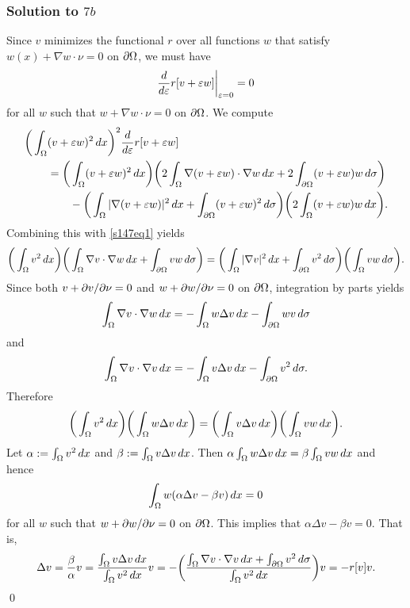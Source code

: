 \subsubsection*{Solution to $7b$}
Since $v$ minimizes the functional $r$ over all functions $w$ that satisfy $w(x) + \nabla w \cdot \nu = 0$ on $\partial\Omega$, we must have
\begin{align}\label{s147eq1}
\frac{d}{d\varepsilon}r[v + \varepsilon w]\bigg|_{\varepsilon = 0} = 0
\end{align}
for all $w$ such that $w + \nabla w \cdot \nu = 0$ on $\partial \Omega$.
We compute
\begin{align*}
\bigg(\int_{\Omega}&(v + \varepsilon w)^{2}\, dx\bigg)^{2}\frac{d}{d\varepsilon}r[v + \varepsilon w]\\
&= \bigg(\int_{\Omega}(v + \varepsilon w)^{2}\, dx\bigg)\bigg(2\int_{\Omega}\nabla(v + \varepsilon w)\cdot \nabla w\, dx+ 2\int_{\partial\Omega}(v + \varepsilon w)w\, d\sigma\bigg)\\
&\quad\quad- \bigg(\int_{\Omega}|\nabla(v + \varepsilon w)|^{2}\, dx+ \int_{\partial\Omega}(v + \varepsilon w)^{2}\, d\sigma\bigg)\bigg(2\int_{\Omega}(v + \varepsilon w)w\, dx\bigg).
\end{align*}
Combining this with \eqref{s147eq1} yields
\begin{align*}
\bigg(\int_{\Omega}v^{2}\, dx\bigg)\bigg(\int_{\Omega}\nabla v \cdot \nabla w\, dx + \int_{\partial \Omega}vw\, d\sigma\bigg) = \bigg(\int_{\Omega}|\nabla v|^{2}\,dx + \int_{\partial\Omega}v^{2}\, d\sigma\bigg)\bigg(\int_{\Omega}vw\, d\sigma\bigg).
\end{align*}
Since both $v + \partial v/\partial \nu = 0$ and $w + \partial w/\partial \nu = 0$ on $\partial\Omega$, integration by parts yields
$$\int_{\Omega}\nabla v \cdot \nabla w\, dx = -\int_{\Omega}w\Delta v\, dx - \int_{\partial\Omega}wv\, d\sigma$$
and
\begin{align}\label{s147eq2}
\int_{\Omega}\nabla v \cdot \nabla v\, dx = -\int_{\Omega}v\Delta v\, dx - \int_{\partial\Omega}v^{2}\, d\sigma.
\end{align}
Therefore
$$\bigg(\int_{\Omega}v^{2}\, dx \bigg)\bigg(\int_{\Omega}w\Delta v\, dx\bigg) = \bigg(\int_{\Omega}v\Delta v\, dx\bigg)\bigg(\int_{\Omega}vw\, dx\bigg).$$
Let $\alpha := \int_{\Omega}v^{2}\, dx$ and $\beta := \int_{\Omega}v\Delta v\, dx$. Then $\alpha\int_{\Omega}w\Delta v\, dx = \beta\int_{\Omega}vw\, dx$ and hence
$$\int_{\Omega}w(\alpha \Delta v - \beta v)\, dx = 0$$
for all $w$ such that $w + \partial w/\partial\nu = 0$ on $\partial \Omega$. This implies that $\alpha\Delta v - \beta v = 0$. That is,
\begin{align*}
\Delta v = \frac{\beta}{\alpha}v = \frac{\int_{\Omega}v\Delta v\, dx}{\int_{\Omega}v^{2}\, dx}v = -\bigg(\frac{\int_{\Omega}\nabla v\cdot \nabla v\, dx + \int_{\partial\Omega}v^{2}\, d\sigma}{\int_{\Omega}v^{2}\, dx}\bigg)v = -r[v]v.
\end{align*}
\hfill\qed

